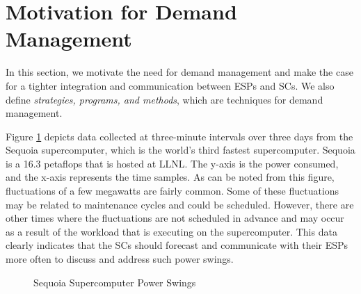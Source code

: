 \section{Motivation for Demand Management}
\label{strategies}

In this section, we motivate the need for demand management and make the case for a tighter integration and communication between ESPs and SCs. We also define \emph{strategies, programs, and methods}, which are techniques for demand management. 

Figure \ref{fig:seq} depicts data collected at three-minute intervals over three days from the Sequoia supercomputer, which is the world's third fastest supercomputer. Sequoia is a 16.3 petaflops that is hosted at LLNL. The y-axis is the power consumed, and the x-axis represents the time samples. As can be noted from this figure, fluctuations of a few megawatts are fairly common. Some of these fluctuations may be related to maintenance cycles and could be scheduled. However, there are other times where the fluctuations are not scheduled in advance and may occur as a result of the workload that is executing on the supercomputer. This data clearly indicates that the SCs should forecast and communicate with their ESPs more often to discuss and address such power swings. \\

\begin{figure}
\begin{center}
\caption{Sequoia Supercomputer Power Swings}
\label{fig:seq}
\end{center}
\end{figure}

